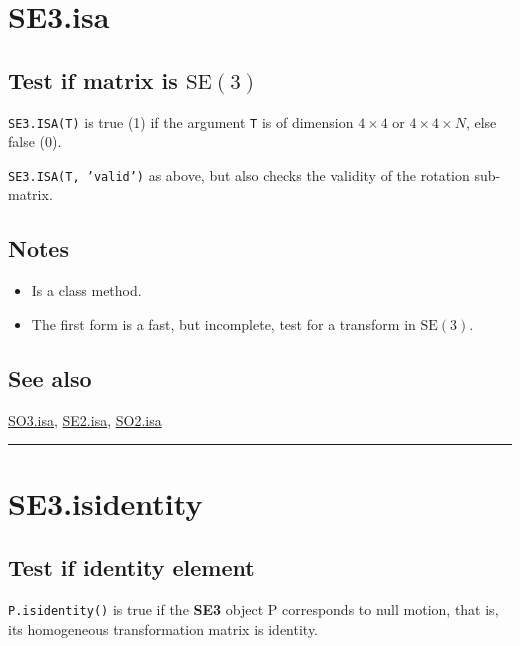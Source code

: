 \hypertarget{SE3.isa}{\section*{SE3.isa}}
\subsection*{Test if matrix is $\mbox{SE}(3)$}


\texttt{SE3.ISA(T)} is true (1) if the argument \texttt{T} is of dimension $4 \times 4$ or $4 \times 4 \times N$, else
false (0).



\texttt{SE3.ISA(T, 'valid')} as above, but also checks the validity of the rotation
sub-matrix.


\subsection*{Notes}
\begin{itemize}
  \item Is a class method.
  \item The first form is a fast, but incomplete, test for a transform in $\mbox{SE}(3)$.
\end{itemize}

\subsection*{See also}


\hyperlink{SO3.isa}{\color{blue} SO3.isa}, \hyperlink{SE2.isa}{\color{blue} SE2.isa}, \hyperlink{SO2.isa}{\color{blue} SO2.isa}

\vspace{1.5ex}\hrule

\hypertarget{SE3.isidentity}{\section*{SE3.isidentity}}
\subsection*{Test if identity element}


\texttt{P.isidentity()} is true if the \textbf{\color{red} SE3} object P corresponds to null motion,
that is, its homogeneous transformation matrix is identity.

